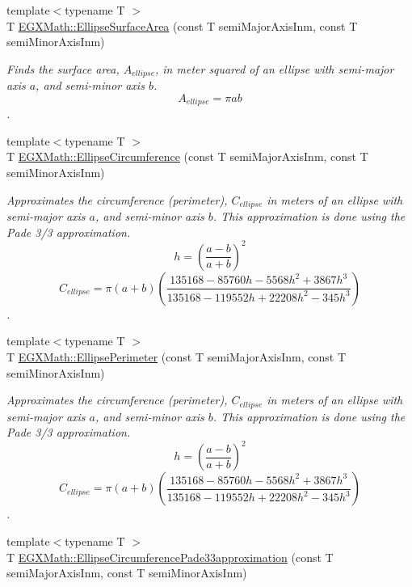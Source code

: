 \begin{DoxyCompactItemize}
\item 
{\footnotesize template$<$typename T $>$ }\\T \mbox{\hyperlink{group___e_g_x_math-_geometry-2_d-_ellipse_ga4ce8c8323e9718ce5458f4ab7f6d823d}{E\+G\+X\+Math\+::\+Ellipse\+Surface\+Area}} (const T semi\+Major\+Axis\+Inm, const T semi\+Minor\+Axis\+Inm)
\begin{DoxyCompactList}\small\item\em Finds the surface area, $A_{ellipse}$, in meter squared of an ellipse with semi-\/major axis $a$, and semi-\/minor axis $b$. \[ A_{ellipse}=\pi a b \]. \end{DoxyCompactList}\item 
{\footnotesize template$<$typename T $>$ }\\T \mbox{\hyperlink{group___e_g_x_math-_geometry-2_d-_ellipse_ga4172802ac674eb53467b44928ac635c7}{E\+G\+X\+Math\+::\+Ellipse\+Circumference}} (const T semi\+Major\+Axis\+Inm, const T semi\+Minor\+Axis\+Inm)
\begin{DoxyCompactList}\small\item\em Approximates the circumference (perimeter), $C_{ellipse}$ in meters of an ellipse with semi-\/major axis $a$, and semi-\/minor axis $b$. This approximation is done using the Pade 3/3 approximation. \[ h=\left( \frac{a-b}{a+b} \right)^2 \] \[ C_{ellipse}=\pi (a + b) \left( \frac{135168-85760 h-5568 h^2+ 3867 h^3}{135168-119552 h+ 22208 h^2 - 345h^3} \right) \]. \end{DoxyCompactList}\item 
{\footnotesize template$<$typename T $>$ }\\T \mbox{\hyperlink{group___e_g_x_math-_geometry-2_d-_ellipse_ga2d4ee70e08d6fb4b56209ad4fc3f38ca}{E\+G\+X\+Math\+::\+Ellipse\+Perimeter}} (const T semi\+Major\+Axis\+Inm, const T semi\+Minor\+Axis\+Inm)
\begin{DoxyCompactList}\small\item\em Approximates the circumference (perimeter), $C_{ellipse}$ in meters of an ellipse with semi-\/major axis $a$, and semi-\/minor axis $b$. This approximation is done using the Pade 3/3 approximation. \[ h=\left( \frac{a-b}{a+b} \right)^2 \] \[ C_{ellipse}=\pi (a + b) \left( \frac{135168-85760 h-5568 h^2+ 3867 h^3}{135168-119552 h+ 22208 h^2 - 345h^3} \right) \]. \end{DoxyCompactList}\item 
{\footnotesize template$<$typename T $>$ }\\T \mbox{\hyperlink{group___e_g_x_math-_geometry-2_d-_ellipse_ga0e0b290f1da2605c16ec13b9e221769d}{E\+G\+X\+Math\+::\+Ellipse\+Circumference\+Pade33approximation}} (const T semi\+Major\+Axis\+Inm, const T semi\+Minor\+Axis\+Inm)

\end{DoxyCompactItemize}
